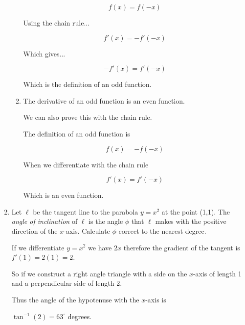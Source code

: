 \documentclass{article}
\begin{document}
\begin{enumerate}
\begin{enumerate}
				$$f(x) = f(-x)$$

				Using the chain rule...

				$$f'(x) = -f'(-x)$$

				Which gives...

				$$-f'(x) = f'(-x)$$

				Which is the definition of an odd function.

			\item The derivative of an odd function is an even function.

				We can also prove this with the chain rule.

				The definition of an odd function is

				$$f(x) = -f(-x)$$

				When we differentiate with the chain rule

				$$f'(x) = f'(-x)$$

				Which is an even function.
				
		\end{enumerate}

		\item Let $\ell$ be the tangent line to the parabola $y=x^2$ at the point (1,1).
			The \emph{angle of inclination} of $\ell$ is the angle $\phi$ that $\ell$
			makes with the positive direction of the $x$-axis. Calculate $\phi$
			correct to the nearest degree.

			If we differentiate $y = x^2$ we have $2x$ therefore the gradient of
			the tangent is $f'(1) = 2(1) = 2$.

			So if we construct a right angle triangle with a side on the $x$-axis
			of length 1 and a perpendicular side of length 2.

			Thus the angle of the hypotenuse with the $x$-axis is

			$\tan^{-1} (2) = 63^{\circ}$ degrees.

	\end{enumerate}
\end{document}
